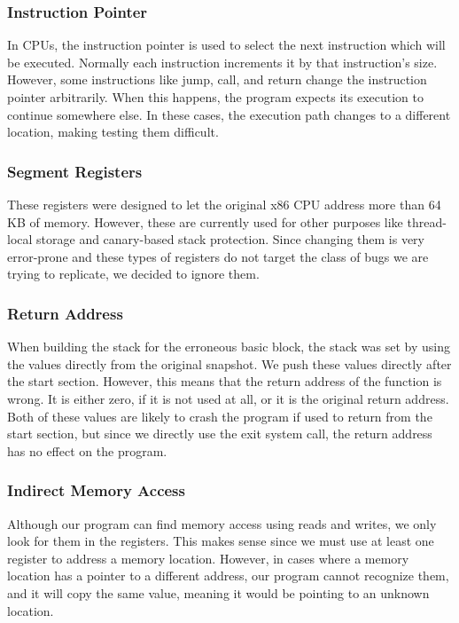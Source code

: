 \subsubsection{Instruction Pointer}
In CPUs, the instruction pointer is used to select the next instruction which will be executed.
Normally each instruction increments it by that instruction's size.
However, some instructions like jump, call, and return change the instruction pointer arbitrarily.
When this happens, the program expects its execution to continue somewhere else.
In these cases, the execution path changes to a different location, making testing them difficult.

\subsubsection{Segment Registers}
These registers were designed to let the original x86 CPU address more than 64 KB of memory.
However, these are currently used for other purposes like thread-local storage and canary-based stack protection.
Since changing them is very error-prone and these types of registers do not target the class of bugs we are trying to replicate, we decided to ignore them.

\subsubsection{Return Address}
When building the stack for the erroneous basic block,  the stack was set by using the values directly from the original snapshot.
We push these values directly after the start section.
However, this means that the return address of the function is wrong.
It is either zero, if it is not used at all, or it is the original return address.
Both of these values are likely to crash the program if used to return from the start section, but since we directly use the exit system call, the return address has no effect on the program.

\subsubsection{Indirect Memory Access}
Although our program can find memory access using reads and writes, we only look for them in the registers.
This makes sense since we must use at least one register to address a memory location.
However, in cases where a memory location has a pointer to a different address, our program cannot recognize them, and it will copy the same value, meaning it would be pointing to an unknown location.

